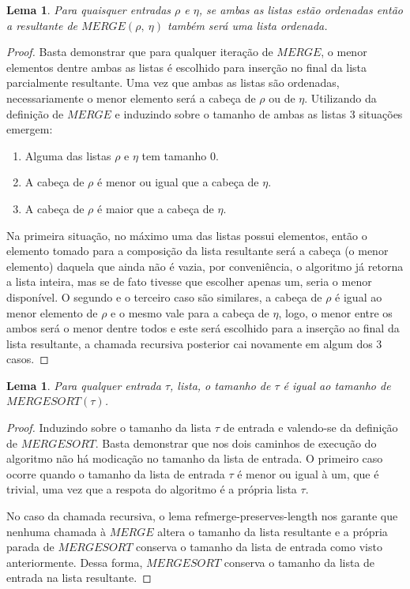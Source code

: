\documentclass[12pt]{article}
\newtheorem{lemma}[theorem]{Lema}
\theoremstyle{definition}
\begin{document}
\begin{lemma}
\label{merge-of-sorted-is-sorted}
        Para quaisquer entradas $\rho$ e $\eta$, se ambas as listas estão ordenadas então
        a resultante de $MERGE(\rho,\ \eta)$ também será uma lista ordenada. 
\end{lemma}

\begin{proof}
        Basta demonstrar que para qualquer iteração de $MERGE$, o menor elementos dentre ambas as listas é escolhido para inserção no final
        da lista parcialmente resultante. Uma vez que ambas as listas são ordenadas, necessariamente o menor elemento será a cabeça de $\rho$ ou de $\eta$.
        Utilizando da definição de $MERGE$ e induzindo sobre o tamanho de ambas as listas 3 situações emergem:
        \begin{enumerate}
                \item Alguma das listas $\rho$ e $\eta$ tem tamanho 0.
                \item A cabeça de $\rho$ é menor ou igual que a cabeça de $\eta$.
                \item A cabeça de $\rho$ é maior que a cabeça de $\eta$.
        \end{enumerate}

        Na primeira situação, no máximo uma das listas possui elementos, então o elemento tomado para a composição da lista resultante será a cabeça
        (o menor elemento) daquela que ainda não é vazia, por conveniência, o algoritmo já retorna a lista inteira, mas se de fato tivesse que escolher apenas
        um, seria o menor disponível. O segundo e o terceiro caso são similares, a cabeça de $\rho$ é igual ao menor elemento de $\rho$ e o mesmo vale para a cabeça
        de $\eta$, logo, o menor entre os ambos será o menor dentre todos e este será escolhido para a inserção ao final da lista resultante, a chamada recursiva 
        posterior cai novamente em algum dos 3 casos.

\end{proof}

\begin{lemma}
\label{mergesort-preserves-length}
        Para qualquer entrada $\tau$, lista, o tamanho de $\tau$ é igual ao tamanho de $MERGESORT(\tau)$.
\end{lemma}

\begin{proof}
        Induzindo sobre o tamanho da lista $\tau$ de entrada e valendo-se da definição de $MERGESORT$. Basta demonstrar
        que nos dois caminhos de execução do algoritmo não há modicação no tamanho da lista de entrada. O primeiro caso
        ocorre quando o tamanho da lista de entrada $\tau$ é menor ou igual à um, que é trivial, uma vez que a respota do algoritmo
        é a própria lista $\tau$.

        No caso da chamada recursiva, o lema ref{merge-preserves-length} nos garante que nenhuma chamada à $MERGE$ 
        altera o tamanho da lista resultante e a própria parada de $MERGESORT$ conserva o tamanho da lista de entrada como visto
        anteriormente. Dessa forma, $MERGESORT$ conserva o tamanho da lista de entrada na lista resultante. 
\end{proof}
\end{document}

